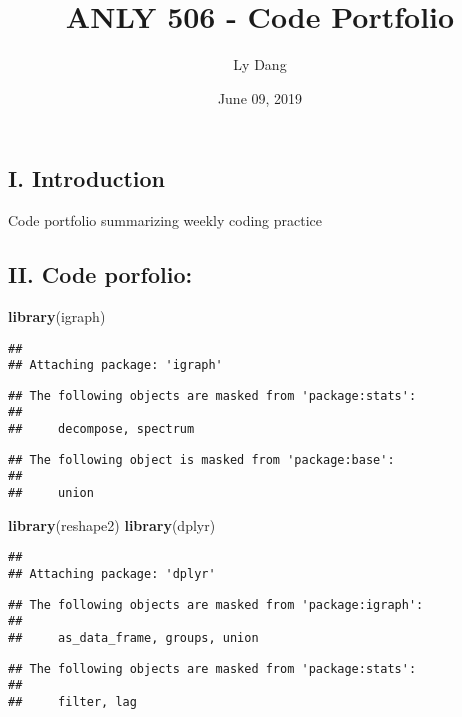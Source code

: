 \documentclass[]{article}
\title{ANLY 506 - Code Portfolio}
\author{Ly Dang}
\date{June 09, 2019}
\newenvironment{Shaded}{\begin{snugshade}}{\end{snugshade}}
\newcommand{\KeywordTok}[1]{\textcolor[rgb]{0.13,0.29,0.53}{\textbf{#1}}}
\newcommand{\NormalTok}[1]{#1}
\begin{document}
\maketitle

\subsection{I. Introduction}\label{i.-introduction}

Code portfolio summarizing weekly coding practice

\subsection{II. Code porfolio:}\label{ii.-code-porfolio}

\begin{Shaded}
\begin{Highlighting}[]
\KeywordTok{library}\NormalTok{(igraph)}
\end{Highlighting}
\end{Shaded}

\begin{verbatim}
## 
## Attaching package: 'igraph'
\end{verbatim}

\begin{verbatim}
## The following objects are masked from 'package:stats':
## 
##     decompose, spectrum
\end{verbatim}

\begin{verbatim}
## The following object is masked from 'package:base':
## 
##     union
\end{verbatim}

\begin{Shaded}
\begin{Highlighting}[]
\KeywordTok{library}\NormalTok{(reshape2)}
\KeywordTok{library}\NormalTok{(dplyr)}
\end{Highlighting}
\end{Shaded}

\begin{verbatim}
## 
## Attaching package: 'dplyr'
\end{verbatim}

\begin{verbatim}
## The following objects are masked from 'package:igraph':
## 
##     as_data_frame, groups, union
\end{verbatim}

\begin{verbatim}
## The following objects are masked from 'package:stats':
## 
##     filter, lag
\end{verbatim}
\end{document}
